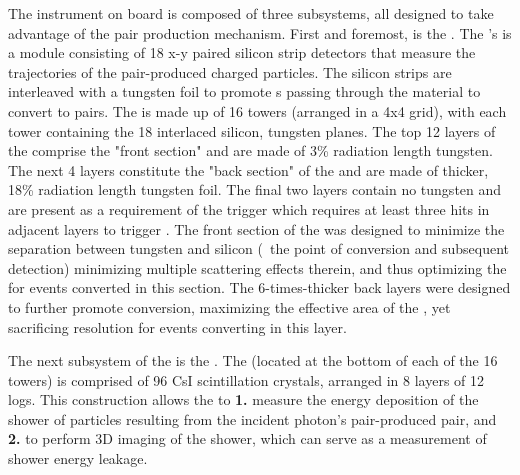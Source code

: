 The \lat{} instrument on board \Fermi{} is composed of three subsystems, all designed to take advantage of the pair production mechanism. First and foremost, is the \tkr{}. The \lat{}'s \tkr{} is a module consisting of 18 x-y paired silicon strip detectors that measure the trajectories of the pair-produced charged particles. The silicon strips are interleaved with a tungsten foil to promote \gam{}s passing through the material to convert to \ee{} pairs. The \lat{} is made up of 16 towers (arranged in a 4x4 grid), with each tower containing the 18 interlaced silicon, tungsten planes. The top 12 layers of the \tkr{} comprise the "front section" and are made of 3\% radiation length tungsten. The next 4 layers constitute the "back section" of the \tkr{} and are made of thicker, 18\% radiation length tungsten foil. The final two \tkr{} layers contain no tungsten and are present as a requirement of the \tkr{} trigger which requires at least three hits in adjacent layers to trigger \citep{lat_perf}. The front section of the \tkr{} was designed to minimize the separation between tungsten and silicon (\ie{}\ the point of conversion and subsequent detection) minimizing multiple scattering effects therein, and thus optimizing the \psf{} for events converted in this section. The 6-times-thicker back layers were designed to further promote conversion, maximizing the effective area of the \lat{}, yet sacrificing resolution for events converting in this layer.

The next subsystem of the \lat{} is the \calo{}. The \calo{} (located at the bottom of each of the 16 towers) is comprised of 96 CsI scintillation crystals, arranged in 8 layers of 12 logs. This construction allows the \calo{} to {\bf 1.} measure the energy deposition of the shower of particles resulting from the incident photon's pair-produced \ee{} pair, and {\bf 2.} to perform 3D imaging of the shower, which can serve as a measurement of shower energy leakage.


